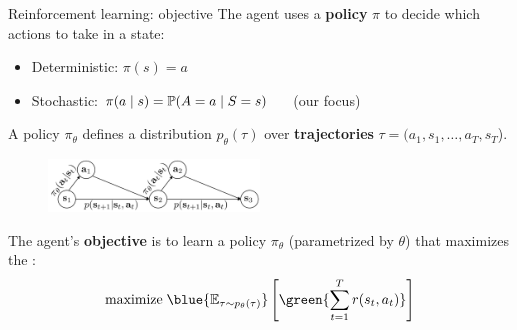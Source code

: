 \documentclass[usenames,dvipsnames,notes,11pt,aspectratio=169,hyperref={colorlinks=true, linkcolor=blue}]{beamer}
\begin{document}
\begin{frame}
    {Reinforcement learning: objective}{}
    The agent uses a {\bf policy} $\pi$ to decide which actions to take in a state:\\
    \begin{itemize}
        \item Deterministic: $\pi(s) = a$
        \item Stochastic: $\pi(a\mid s) = \mathbb{P}(A=a\mid S=s)$ $\quad$ (our focus)
    \end{itemize}
    \pause

    A policy $\pi_\theta$ defines a distribution $p_\theta(\tau)$ over \textbf{trajectories} $\tau=(a_1,s_1,\ldots,a_T,s_T$).
    \vspace{-1em}
    \begin{figure}
        \includegraphics[width=0.5\textwidth]{figures/traj}
    \end{figure}

    \pause\vspace{-1ex}
    The agent's {\bf objective} is to learn a policy $\pi_\theta$ (parametrized by $\theta$) that maximizes the  :
    \vspace{-1ex}
    $$
    \mathrm{maximize}\; \blue{\BE_{{\tau\sim p_\theta(\tau)}}} \pb{\green{\sum_{t=1}^T r(s_t, a_t)}}
    $$
\end{frame}
\end{document}
